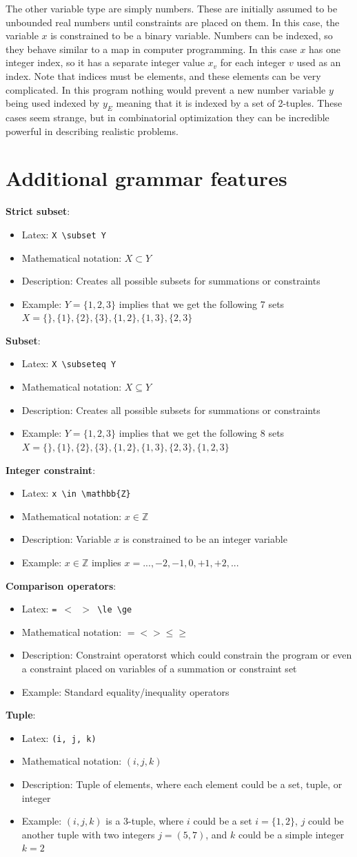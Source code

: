 \documentclass{article}
\newcommand{\subheader}[1]{
    \vspace{0.5in}
    \noindent\textbf{#1}:
}
\newcommand{\mboldescrip}[5]{
    \subheader{#1}
    \begin{itemize}
        \item Latex: \texttt{#2}
        \item Mathematical notation: #3
        \item Description: #4
        \item Example: #5
    \end{itemize}
}
\begin{document}
The other variable type are simply numbers. These are initially assumed to be unbounded real numbers until constraints are placed on them. In this case, the variable $x$ is constrained to be a binary variable. Numbers can be indexed, so they behave similar to a map in computer programming. In this case $x$ has one integer index, so it has a separate integer value $x_v$ for each integer $v$ used as an index. Note that indices must be elements, and these elements can be very complicated. In this program nothing would prevent a new number variable $y$ being used indexed by $y_E$ meaning that it is indexed by a set of 2-tuples. These cases seem strange, but in combinatorial optimization they can be incredible powerful in describing realistic problems.

\begin{mbol}
\end{mbol}

\section{Additional grammar features}

\mboldescrip{Strict subset}{X \textbackslash subset Y}{$X \subset Y$}{Creates all possible subsets for summations or constraints}{$Y=\{1,2,3\}$ implies that we get the following 7 sets $X=\{\},\{1\},\{2\},\{3\},\{1,2\},\{1,3\},\{2,3\}$}

\mboldescrip{Subset}{X \textbackslash subseteq Y}{$X \subseteq Y$}{Creates all possible subsets for summations or constraints}{$Y=\{1,2,3\}$ implies that we get the following 8 sets $X=\{\},\{1\},\{2\},\{3\},\{1,2\},\{1,3\},\{2,3\},\{1,2,3\}$}

\mboldescrip{Integer constraint}{x \textbackslash in \textbackslash mathbb\{Z\}}{$x\in \mathbb{Z}$}{Variable $x$ is constrained to be an integer variable}{$x \in \mathbb{Z}$ implies $x = ...,-2,-1,0,+1,+2,...$}

\mboldescrip{Comparison operators}{= $<$ $>$ \textbackslash le \textbackslash ge}{$= < > \le \ge$}{Constraint operatorst which could constrain the program or even a constraint placed on variables of a summation or constraint set}{Standard equality/inequality operators}

\mboldescrip{Tuple}{(i, j, k)}{$(i,j,k)$}{Tuple of elements, where each element could be a set, tuple, or integer}{$(i,j,k)$ is a 3-tuple, where $i$ could be a set $i=\{1,2\}$, $j$ could be another tuple with two integers $j=(5,7)$, and $k$ could be a simple integer $k=2$}
\end{document}
